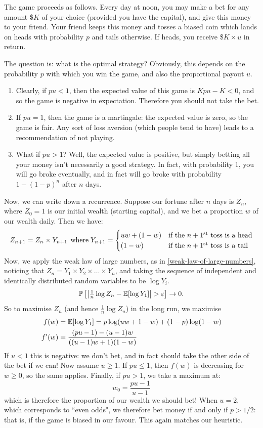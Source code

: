 \documentclass{article}
\begin{document}
The game proceeds as follows. Every day at noon, you may make a bet for any amount \$$K$ of your choice (provided you have the capital), and give this money to your friend.
Your friend keeps this money and tosses a biased coin which lands on heads with probability $p$ and tails otherwise. If heads, you receive \$$K \times u$ in return.

The question is: what is the optimal strategy? Obviously, this depends on the probability $p$ with which you win the game, and also the proportional payout $u$.
\begin{enumerate}
    \item Clearly, if $p u < 1$, then the expected value of this game is $Kpu-K < 0$, and so the game is negative in expectation. Therefore you should not take the bet.
    \item If $pu = 1$, then the game is a martingale: the expected value is zero, so the game is fair. Any sort of loss aversion (which people tend to have) leads to a recommendation of not playing.
    \item What if $p u > 1$? Well, the expected value is positive, but simply betting all your money isn't necessarily a good strategy. In fact, with probability 1, you will go broke eventually, and in fact will go broke with probability $1-(1-p)^n$ after $n$ days.
\end{enumerate}

Now, we can write down a recurrence.
Suppose our fortune after $n$ days is $Z_n$,
where $Z_0 = 1$ is our initial wealth (starting capital),
and we bet a proportion $w$ of our wealth daily. Then we have:
\[
Z_{n+1} = Z_n \times Y_{n+1} \mathrel{\, \text{where}}
Y_{n+1} = \begin{cases}
	uw + (1-w) & \text{if the $n+1^\text{st}$ toss is a head} \\
	(1-w) & \text{if the $n+1^\text{st}$ toss is a tail} \\
\end{cases}
\]
Now, we apply the weak law of large numbers,
as in \ref{weak-law-of-large-numbers},
noticing that $Z_n = Y_1 \times Y_2 \times \dots \times Y_n$,
and taking the sequence of independent and identically distributed random variables to be $\log Y_i$.
\[
\mathbb{P}\left[ \left\lvert \tfrac{1}{n} \log Z_n - \mathbb{E}[\log Y_1] \right\rvert > \varepsilon \right] \to 0.
\]
So to maximise $Z_n$ (and hence $\tfrac{1}{n} \log Z_n$) in the long run, we maximise
\begin{align*}
    f(w) &= \mathbb{E}[ \log Y_1 ] = p \log (uw + 1-w) + (1-p) \log (1-w) \\
    f'(w) &= \frac{(pu-1)-(u-1)w}{((u-1)w+1)(1-w)}
\end{align*}
If $u < 1$ this is negative:
we don't bet, and in fact should take the other side of the bet if we can!
Now assume $u \geq 1$. If $pu \leq 1$,
then $f(w)$ is decreasing for $w \geq 0$, so the same applies.
Finally, if $pu > 1$, we take a maximum at:
\[
w_0 = \frac{pu-1}{u-1}
\]
which is therefore the proportion of our wealth we should bet!
When $u = 2$, which corresponds to ``even odds", we therefore bet money if and only if $p > 1/2$: that is, if the game is biased in our favour.
This again matches our heuristic.
\end{document}
